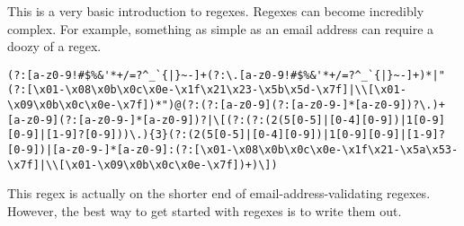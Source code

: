 This is a very basic introduction to regexes. Regexes can become incredibly complex. For example, something as simple as an email address can require a doozy of a regex.\par
\begin{lstlisting}[style=none]
(?:[a-z0-9!#$%&'*+/=?^_`{|}~-]+(?:\.[a-z0-9!#$%&'*+/=?^_`{|}~-]+)*|"(?:[\x01-\x08\x0b\x0c\x0e-\x1f\x21\x23-\x5b\x5d-\x7f]|\\[\x01-\x09\x0b\x0c\x0e-\x7f])*")@(?:(?:[a-z0-9](?:[a-z0-9-]*[a-z0-9])?\.)+[a-z0-9](?:[a-z0-9-]*[a-z0-9])?|\[(?:(?:(2(5[0-5]|[0-4][0-9])|1[0-9][0-9]|[1-9]?[0-9]))\.){3}(?:(2(5[0-5]|[0-4][0-9])|1[0-9][0-9]|[1-9]?[0-9])|[a-z0-9-]*[a-z0-9]:(?:[\x01-\x08\x0b\x0c\x0e-\x1f\x21-\x5a\x53-\x7f]|\\[\x01-\x09\x0b\x0c\x0e-\x7f])+)\])
\end{lstlisting}
This regex is actually on the shorter end of email-address-validating regexes. However, the best way to get started with regexes is to write them out.
